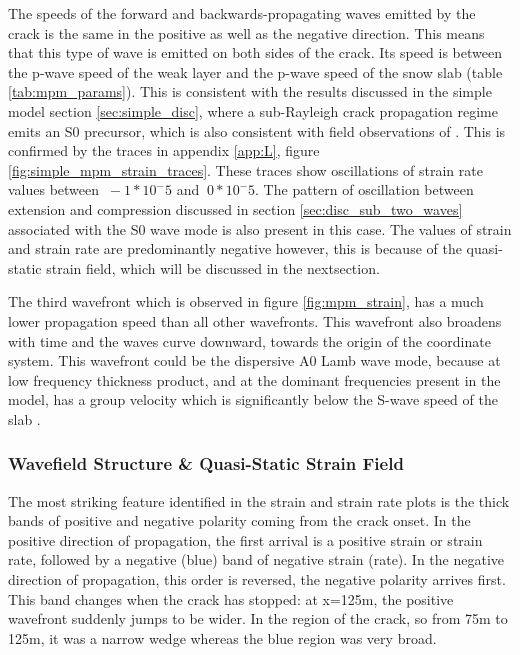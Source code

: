 The speeds of the forward and backwards-propagating waves emitted by the crack is the same in the positive as well as the negative direction. This means that this type of wave is emitted on both sides of the crack. Its speed is between the p-wave speed of the weak layer and the p-wave speed of the snow slab (table \ref{tab:mpm_params}). This is consistent with the results discussed in the simple model section \ref{sec:simple_disc}, where a sub-Rayleigh crack propagation regime emits an S0 precursor, which is also consistent with field observations of \cite{herwijnenSeismicSensorArray2011}. This is confirmed by the traces in appendix \ref{app:L}, figure \ref{fig:simple_mpm_strain_traces}. These traces show oscillations of strain rate values between $\ -1*10^-5$ and $\ 0*10^-5$. The pattern of oscillation between extension and compression discussed in section \ref{sec:disc_sub_two_waves} associated with the S0 wave mode is also present in this case. The values of strain and strain rate are predominantly negative however, this is because of the quasi-static strain field, which will be discussed in the nextsection. \par

The third wavefront which is observed in figure \ref{fig:mpm_strain}, has a much lower propagation speed than all other wavefronts. This wavefront also broadens with time and the waves curve downward, towards the origin of the coordinate system. This wavefront could be the dispersive A0 Lamb wave mode, because at low frequency thickness product, and at the dominant frequencies present in the model, has a group velocity which is significantly below the S-wave speed of the slab \parencite{roseWavesPlates2014}. \par

\subsubsection{Wavefield Structure \& Quasi-Static Strain Field }

The most striking feature identified in the strain and strain rate plots is the thick bands of positive and negative polarity coming from the crack onset. In the positive direction of propagation, the first arrival is a positive strain or strain rate, followed by a negative (blue) band of negative strain (rate). In the negative direction of propagation, this order is reversed, the negative polarity arrives first. This band changes when the crack has stopped: at x=125m, the positive wavefront suddenly jumps to be wider. In the region of the crack, so from 75m to 125m, it was a narrow wedge whereas the blue region was very broad. \par

